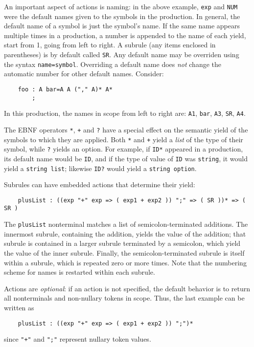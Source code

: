 An important aspect of actions is naming: in the above example, \texttt{exp} and \texttt{NUM} were the default names given to the symbols in the production.  In general, the default name of a symbol is just the symbol's name.  If the same name appears multiple times in a production, a number is appended to the name of each yield, start from 1, going from left to right.  A subrule (any items enclosed in parentheses) is by default called \texttt{SR}.  Any default name may be overriden using the syntax \texttt{name=symbol}.  Overriding a default name does \emph{not} change the automatic number for other default names.  Consider:
\begin{verbatim}
    foo : A bar=A A ("," A)* A*
        ;
\end{verbatim}
In this production, the names in scope from left to right are: \texttt{A1}, \texttt{bar}, \texttt{A3}, \texttt{SR}, \texttt{A4}.

The EBNF operators \texttt{*}, \texttt{+} and \texttt{?} have a special effect on the semantic yield of the symbols to which they are applied.  Both \texttt{*} and \texttt{+} yield a \emph{list} of the type of their symbol, while \texttt{?} yields an option.  For example, if \texttt{ID*} appeared in a production, its default name would be \texttt{ID}, and if the type of value of \texttt{ID} was \texttt{string}, it would yield a \texttt{string list}; likewise \texttt{ID?} would yield a \texttt{string option}.  

Subrules can have embedded actions that determine their yield:
\begin{verbatim}
    plusList : ((exp "+" exp => ( exp1 + exp2 )) ";" => ( SR ))* => ( SR )
\end{verbatim}
The \texttt{plusList} nonterminal matches a list of semicolon-terminated additions.  The innermost subrule, containing the addition, yields the value of the addition; that subrule is contained in a larger subrule terminated by a semicolon, which yield the value of the inner subrule.  Finally, the semicolon-terminated subrule is itself within a subrule, which is repeated zero or more times.  Note that the numbering scheme for names is restarted within each subrule.

Actions are \emph{optional}: if an action is not specified, the default behavior is to return all nonterminals and non-nullary tokens in scope.  Thus, the last example can be written as 
\begin{verbatim}
    plusList : ((exp "+" exp => ( exp1 + exp2 )) ";")*
\end{verbatim}
since \texttt{"+"} and \texttt{";"} represent nullary token values.

